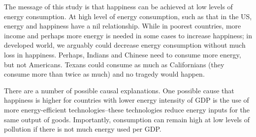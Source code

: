 \documentclass[10pt, letterpaper]{article}
\begin{document}
\begin{spacing}{1.4}
The message of this study is that happiness can be achieved at low levels of
energy consumption. At high level of energy consumption, such as
that in the  US, energy and happiness have a nil relationship. %
While in poorest countries, more  income and perhaps more energy
 is needed in some cases to increase happiness; in developed world, we arguably could  decrease
energy consumption without much loss in happiness. %
Perhaps, Indians and Chinese need to consume more energy, but not Americans. 
Texans could consume as much as Californians (they consume more than twice as
much) and no tragedy would happen. %

There are a number of possible causal explanations. One possible cause that
happiness is higher for countries with lower energy intensity of GDP is the use
of more energy-efficient technologies--these technologies reduce energy inputs
for the same output of goods. Importantly, consumption can remain high at low
levels of pollution if there is not much energy used per GDP. %


\end{spacing}
\end{document}
